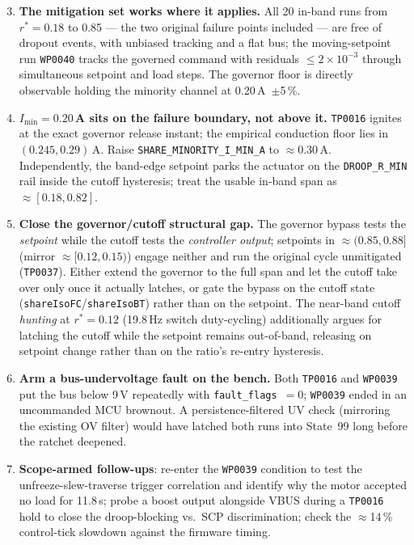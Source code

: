 \documentclass[11pt]{article}
\newcommand{\code}[1]{\texttt{#1}}
\begin{document}
\begin{enumerate}
\setcounter{enumi}{2}
\item \textbf{The mitigation set works where it applies.} All 20 in-band runs from
$r^\ast=0.18$ to 0.85 --- the two original failure points included --- are free of
dropout events, with unbiased tracking and a flat bus; the moving-setpoint run
\code{WP0040} tracks the governed command with residuals $\leq2\times10^{-3}$
through simultaneous setpoint and load steps. The governor floor is directly
observable holding the minority channel at 0.20\,A~$\pm$5\,\%.
\item \textbf{$I_\mathrm{min}=0.20$\,A sits on the failure boundary, not above
it.} \code{TP0016} ignites at the exact governor release instant; the empirical
conduction floor lies in $(0.245, 0.29)$\,A. Raise
\code{SHARE\_MINORITY\_I\_MIN\_A} to $\approx$0.30\,A. Independently, the band-edge
setpoint parks the actuator on the \code{DROOP\_R\_MIN} rail inside the cutoff
hysteresis; treat the usable in-band span as $\approx[0.18, 0.82]$.
\item \textbf{Close the governor/cutoff structural gap.} The governor bypass tests
the \emph{setpoint} while the cutoff tests the \emph{controller output}; setpoints
in $\approx(0.85, 0.88]$ (mirror $\approx[0.12, 0.15)$) engage neither and run the
original cycle unmitigated (\code{TP0037}). Either extend the governor to the full
span and let the cutoff take over only once it actually latches, or gate the bypass
on the cutoff state (\code{shareIsoFC}/\code{shareIsoBT}) rather than on the
setpoint. The near-band cutoff \emph{hunting} at $r^\ast=0.12$ (19.8\,Hz
switch duty-cycling) additionally argues for latching the cutoff while the
setpoint remains out-of-band, releasing on setpoint change rather than on the
ratio's re-entry hysteresis.
\item \textbf{Arm a bus-undervoltage fault on the bench.} Both \code{TP0016} and
\code{WP0039} put the bus below 9\,V repeatedly with \code{fault\_flags}~$=0$;
\code{WP0039} ended in an uncommanded MCU brownout. A persistence-filtered UV check
(mirroring the existing OV filter) would have latched both runs into State~99 long
before the ratchet deepened.
\item \textbf{Scope-armed follow-ups}: re-enter the \code{WP0039} condition to
test the unfreeze-slew-traverse trigger correlation and identify why the motor
accepted no load for 11.8\,s; probe a boost output alongside VBUS during a
\code{TP0016} hold to close the droop-blocking vs.\ SCP discrimination; check the
$\approx$14\,\% control-tick slowdown against the firmware timing.
\end{enumerate}
\end{document}
